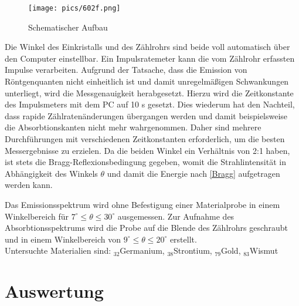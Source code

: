 \begin{figure}[H]
\texttt{[image: pics/602f.png]}
\centering
\caption{Schematischer Aufbau}
\label{Aufbau}
\end{figure}


Die Winkel des Einkristalls und des Zählrohrs sind beide voll automatisch über den Computer einstellbar. Ein Impulsratemeter
kann die vom Zählrohr erfassten Impulse verarbeiten. Aufgrund der Tatsache, dass die Emission von Röntgenquanten nicht
einheitlich ist und damit unregelmäßigen Schwankungen unterliegt, wird die Messgenauigkeit herabgesetzt. Hierzu wird die
Zeitkonstante des Impulsmeters mit dem PC auf 10 s gesetzt. Dies wiederum hat den Nachteil, dass rapide Zählratenänderungen
übergangen werden und damit beispielsweise die Absorbtionskanten nicht mehr wahrgenommen. Daher sind mehrere Durchführungen
mit verschiedenen Zeitkonstanten erforderlich, um die besten Messergebnisse zu erzielen. Da die beiden Winkel ein Verhältnis
von 2:1 haben, ist stets die Bragg-Reflexionsbedingung gegeben, womit die Strahlintensität in Abhängigkeit des Winkels
$\theta$ und damit die Energie nach \eqref{Bragg} aufgetragen werden kann.

Das Emissionsspektrum wird ohne Befestigung einer Materialprobe in einem Winkelbereich für $7^\circ \le \theta \le 30^\circ$ ausgemessen.
Zur Aufnahme des Absorbtionsspektrums wird die Probe auf die Blende des Zählrohrs geschraubt und in einem Winkelbereich von
$9^\circ \le \theta \le 20^\circ$ erstellt.\\
Untersuchte Materialien sind: $_{32}$Germanium, $_{38}$Strontium, $_{79}$Gold, $_{83}$Wismut

 
\section{Auswertung}
